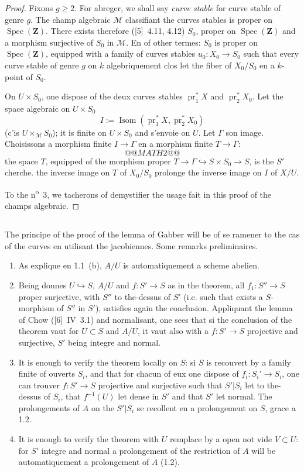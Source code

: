 \documentclass[12pt,a4paper]{article}
\theoremstyle{plain}
\theoremstyle{definition}
\theoremstyle{remark}
\DeclareMathOperator{\Isom}{Isom}
\DeclareMathOperator{\Spec}{Spec}
\DeclareMathOperator{\pr}{pr}
\begin{document}
\begin{proof}
Fixons $g \geq 2$. For abreger, we shall say \emph{curve stable} for curve stable of genre $g$. The champ algebraic $\mathcal{M}$ classifiant the curves stables is proper on $\Spec(\mathbf{Z})$. There exists therefore ([5]~4.11, 4.12) $S_0$, proper on $\Spec(\mathbf{Z})$ and a morphism surjective of $S_0$ in $\mathcal{M}$. En of other termes: $S_0$ is proper on $\Spec(\mathbf{Z})$, equipped with a family of curves stables $u_0 : X_0 \to S_0$ such that every curve stable of genre $g$ on $k$ algebriquement clos let the fiber of $X_0/S_0$ en a $k$-point of $S_0$.

On $U \times S_0$, one dispose of the deux curves stables $\pr_1^* X$ and $\pr_2^* X_0$. Let the space algebraic on $U \times S_0$
\[
I := \Isom(\pr_1^* X, \pr_2^* X_0)
\]
(c'is $U \times_{\mathcal{M}} S_0$); it is finite on $U \times S_0$ and s'envoie on $U$. Let $\Gamma$ son image. Choisissons a morphism finite $I \to \Gamma$ en a morphism finite $T \to \Gamma$:
\[
@@MATH2@@
\]
the space $T$, equipped of the morphism proper $T \to \Gamma \hookrightarrow S \times S_0 \to S$, is the $S'$ cherche. the inverse image on $T$ of $X_0/S_0$ prolonge the inverse image on $I$ of $X/U$.

To the n\textsuperscript{o}~3, we tacherons of demystifier the usage fait in this proof of the champs algebraic.
\end{proof}

\subsection{} The principe of the proof of the lemma of Gabber will be of se ramener to the cas of the curves en utilisant the jacobiennes. Some remarks preliminaires.

\begin{enumerate}[label=(\alph*)]
\item As explique en 1.1~(b), $A/U$ is automatiquement a scheme abelien.
\item Being donnes $U \hookrightarrow S$, $A/U$ and $f : S' \to S$ as in the theorem, all $f_1 : S'' \to S$ proper surjective, with $S''$ to the-dessus of $S'$ (i.e. such that exists a $S$-morphism of $S''$ in $S'$), satisfies again the conclusion. Appliquant the lemma of Chow ([6]~IV~3.1) and normalisant, one sees that si the conclusion of the theorem vaut for $U \subset S$ and $A/U$, it vaut also with a $f : S' \to S$ projective and surjective, $S'$ being integre and normal.
\item It is enough to verify the theorem locally on $S$: si $S$ is recouvert by a family finite of ouverts $S_i$, and that for chacun of eux one dispose of $f_i : S_i' \to S_i$, one can trouver $f : S' \to S$ projective and surjective such that $S'|S_i$ let to the-dessus of $S_i$, that $f^{-1}(U)$ let dense in $S'$ and that $S'$ let normal. The prolongements of $A$ on the $S'|S_i$ se recollent en a prolongement on $S$, grace a 1.2.
\item It is enough to verify the theorem with $U$ remplace by a open not vide $V \subset U$: for $S'$ integre and normal a prolongement of the restriction of $A$ will be automatiquement a prolongement of $A$ (1.2).
\end{enumerate}
\end{document}
